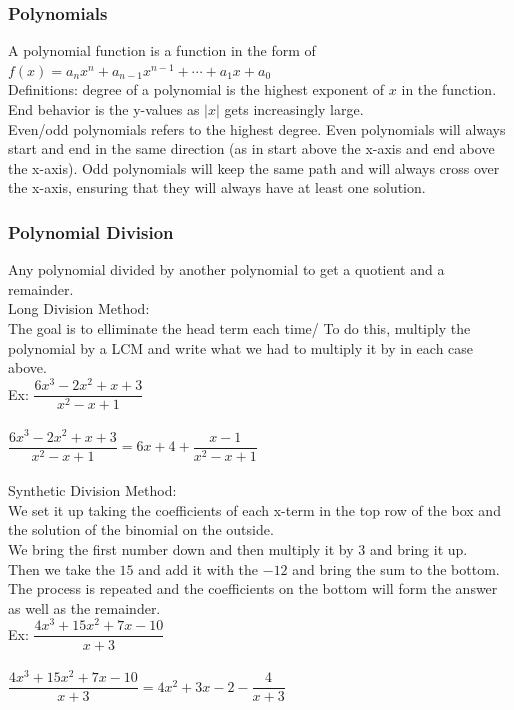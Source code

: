 \documentclass[11pt, fleqn]{article}
\begin{document}
\subsubsection{Polynomials}
A polynomial function is a function in the form of $f(x)=a_nx^n+a_{n-1}x^{n-1}+\cdots+a_1x+a_0$\\
Definitions: degree of a polynomial is the highest exponent of $x$ in the function. End behavior is the y-values as $|x|$ gets increasingly large.\\ Even/odd polynomials refers to the highest degree. Even polynomials will always start and end in the same direction (as in start above the x-axis and end above the x-axis). Odd polynomials will keep the same path and will always cross over the x-axis, ensuring that they will always have at least one solution.
\subsubsection{Polynomial Division}
Any polynomial divided by another polynomial to get a quotient and a remainder.\\
Long Division Method:\\
The goal is to elliminate the head term each time/ To do this, multiply the polynomial by a LCM and write what we had to multiply it by in each case above.\\
Ex: $\dfrac{6x^3-2x^2+x+3}{x^2-x+1}$\\
\\
$\dfrac{6x^3-2x^2+x+3}{x^2-x+1}=6x+4+\dfrac{x-1}{x^2-x+1}$\\
\\
Synthetic Division Method:\\
We set it up taking the coefficients of each x-term in the top row of the box and the solution of the binomial on the outside.\\
We bring the first number down and then multiply it by $3$ and bring it up.\\
Then we take the $15$ and add it with the $-12$ and bring the sum to the bottom. The process is repeated and the coefficients on the bottom will form the answer as well as the remainder.\\
Ex: $\dfrac{4x^3+15x^2+7x-10}{x+3}$\\
 \\
 $\dfrac{4x^3+15x^2+7x-10}{x+3}=4x^2+3x-2-\dfrac{4}{x+3}$
 
\end{document}
